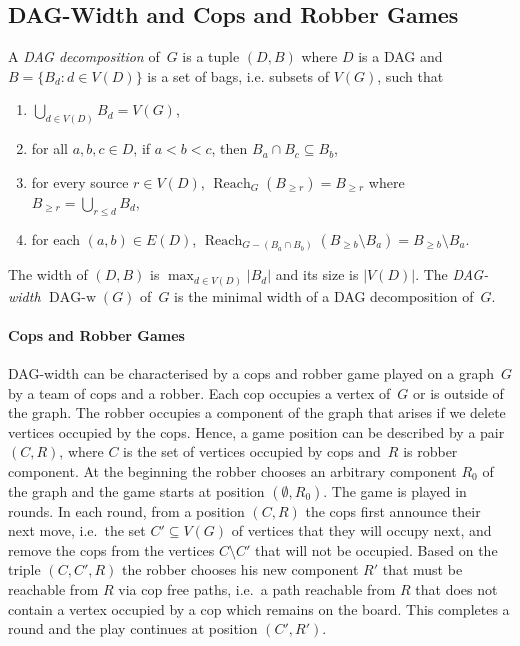 \documentclass[authoryear]{article}
\makeatletter
\theoremstyle{definition}
\DeclareMathOperator{\Reach}{Reach}
\renewcommand{\mid}{\ensuremath{:}}
\newcommand{\0}{\emptyset}
\newcommand{\Dagw}{DAG-{}width\xspace}
\DeclareMathOperator{\DAGW}{DAG\text{-}w}
\newcommand{\ie}{i.e.\@\xspace}
\makeatother
\begin{document}
\subsection{DAG-Width and Cops and Robber Games}
A \emph{DAG decomposition} of~$G$ is a tuple $(D, B)$ where $D$ is a
DAG and $B 
= \{B_d \mid d\in V(D)\}$ is a set of bags, \ie subsets of $V(G)$, such that
\begin{enumerate}
\item $\bigcup_{d\in V(D)} B_d = V(G)$,

\item for all $a,b,c \in D$, if $a < b < c$, then $B_a \cap B_c \subseteq B_b$,

\item for every source $r \in V(D)$, $\Reach_{G}(B_{\ge r}) = B_{\ge r}$
  where $B_{\ge r} = \bigcup_{r\le d} B_d$,

\item for each $(a,b)\in E(D)$, $\Reach_{G - (B_a \cap B_b)}(B_{\ge b}
  \setminus B_a) = B_{\ge b} \setminus B_a$.
\end{enumerate}
The width of $(D, B)$ is $\max_{d\in V(D)} |B_d|$ and its size is $|V(D)|$. The 
\emph{DAG-width} $\DAGW(G)$ of~$G$ is the
minimal width of a DAG decomposition of~$G$.

\paragraph{Cops and Robber Games} \Dagw can be characterised by a cops and
robber game played on a graph~$G$ by a team of cops and a robber. Each cop
occupies a vertex of~$G$ or is outside of the graph. The robber occupies a
component of the graph that arises if we delete vertices occupied by the
cops. Hence, a game position can be described by a pair $(C, R)$, where $C$ is
the set of vertices occupied by cops and~$R$ is robber component. At the
beginning the robber chooses an arbitrary component $R_0$ of the graph and the
game starts at position $(\emptyset, R_0)$. The game is played in rounds. In each
round, from a position $(C, R)$ the cops first announce their next move, \ie~the
set $C'\subseteq V(G)$ of vertices that they will occupy next, and remove the
cops from the vertices $C\setminus C'$ that will not be occupied. Based on the
triple $(C, C', R)$ the robber chooses his new component $R'$ that must be
reachable from $R$ via cop free paths, \ie~a path reachable from $R$ that does
not contain a vertex occupied by a cop which remains on the board.  This
completes a round and the play continues at position $(C', R')$.
\end{document}
